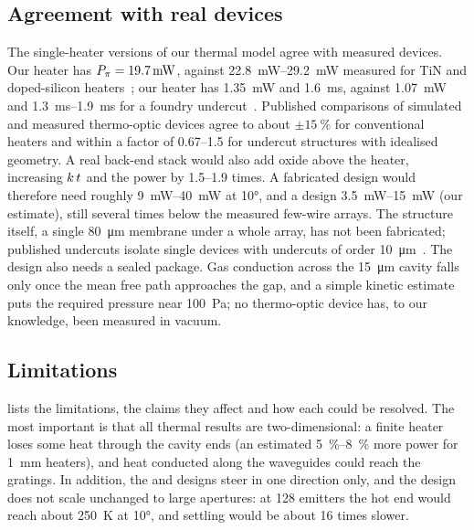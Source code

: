 \subsection{Agreement with real devices}
\label{sec:fidelity}

The single-heater versions of our thermal model agree with measured devices. Our  heater has
$P_{\pi}=\qty{19.7}{\milli\watt}$, against \qtyrange{22.8}{29.2}{\milli\watt} measured for TiN and doped-silicon
heaters~\cite{jacques2019}; our  heater has \qty{1.35}{\milli\watt} and \qty{1.6}{\milli\second},
against \qty{1.07}{\milli\watt} and \qtyrange{1.3}{1.9}{\milli\second} for a foundry undercut~\cite{parsons2025}.
Published comparisons of simulated and measured thermo-optic devices agree to about $\pm\qty{15}{\percent}$ for
conventional heaters and within a factor of \numrange{0.67}{1.5} for undercut structures with idealised geometry. A
real back-end stack would also add oxide above the heater, increasing $k\,t$ and the power by \numrange{1.5}{1.9}
times. A fabricated  design would therefore need roughly \qtyrange{9}{40}{\milli\watt} at \ang{10}, and a
 design \qtyrange{3.5}{15}{\milli\watt} (our estimate), still several times below the measured few-wire
arrays. The structure itself, a single \qty{80}{\micro\metre} membrane under a whole array, has not been fabricated;
published undercuts isolate single devices with undercuts of order \qty{10}{\micro\metre}~\cite{parsons2025}.
The  design also needs a sealed package. Gas conduction across the \qty{15}{\micro\metre} cavity
falls only once the mean free path approaches the gap, and a simple kinetic estimate puts the required pressure
near \qty{100}{\pascal}; no thermo-optic device has, to our knowledge, been measured in vacuum.

\subsection{Limitations}
\label{sec:limitations}

 lists the limitations, the claims they affect and how each could be resolved. The most important is
that all thermal results are two-dimensional: a finite heater loses some heat through the cavity ends (an estimated
\qtyrange{5}{8}{\percent} more power for \qty{1}{\milli\metre} heaters), and heat conducted along the waveguides could
reach the gratings. In addition, the  and  designs steer in one direction only, and the
design does not scale unchanged to large apertures: at \num{128} emitters the hot end would reach about
\qty{250}{\kelvin} at \ang{10}, and settling would be about \num{16} times slower.

